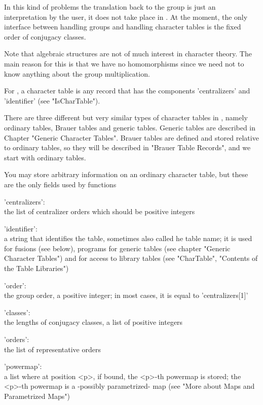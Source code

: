 In this  kind  of  problems the translation back to  the group is just an
interpretation by the  user, it does  not take place in  {\GAP}.   At the
moment, the only interface between handling groups and handling character
tables is the fixed order of conjugacy classes.

Note that  algebraic  structures are  not  of  much interest in character
theory.  The main  reason for this is that we have no homomorphisms since
we need not to know anything about the group multiplication.

%
%

For  {\GAP}, a  character  table is any  record  that  has the components
'centralizers' and 'identifier' (see "IsCharTable").

There are  three different but very similar types of character  tables in
{\GAP},  namely  ordinary  tables,  Brauer  tables  and  generic  tables.
Generic  tables  are described in  Chapter  "Generic  Character  Tables".
Brauer tables are defined and stored relative to ordinary tables, so they
will be described  in  "Brauer Table Records", and we start with ordinary
tables.

You may  store arbitrary information on an  ordinary character table, but
these are the only fields used by {\GAP} functions\:

'centralizers':\\  the list of centralizer orders which should be
                   positive integers

'identifier':\\ a string that identifies the table, sometimes also called
          he table name; it is used for fusions (see below), programs for
          generic tables (see chapter "Generic Character Tables") and for
          access to library tables (see "CharTable", "Contents of the
          Table Libraries")

'order':\\ the group order, a positive integer; in most cases, it is
           equal to 'centralizers[1]'

'classes':\\ the lengths of conjugacy classes, a list of positive
             integers

'orders':\\ the list of representative orders

'powermap':\\ a list where at position <p>, if bound, the <p>-th powermap
              is stored; the <p>-th powermap is a -possibly parametrized-
              map (see "More about Maps and Parametrized Maps")


